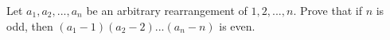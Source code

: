 Let $a_{1},a_{2},...,a_{n}$ be an arbitrary rearrangement of $1,2,...,n$. Prove
that if $n$ is odd, then $(a_{1}-1)(a_{2}-2)...(a_{n}-n)$ is even.
